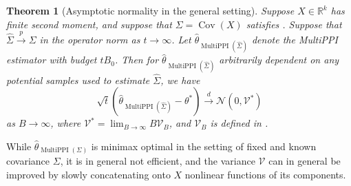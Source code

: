 \documentclass{article} %
\newcommand{\R}{\mathbb{R}}
\DeclareMathOperator{\Cov}{Cov}
\DeclareMathOperator{\multiPPI}{MultiPPI}
\newtheorem{theorem}{Theorem}
\newcommand{\wh}[1]{\widehat{#1}}
\begin{document}
\begin{theorem}[Asymptotic normality in the general setting]\label{thm:asymptotic2} Suppose $X\in\R^k$ has finite second moment, and suppose that $\Sigma=\Cov(X)$ satisfies . Suppose that $\wh{\Sigma}\overset{p}{\to}\Sigma$ in the operator norm as $t\to\infty$. Let $\hat{\theta}_{\multiPPI(\widehat{\Sigma})}$ denote the MultiPPI estimator with budget $tB_0$. Then for $\hat{\theta}_{\multiPPI(\widehat{\Sigma})}$ arbitrarily dependent on any potential samples used to estimate $\widehat{\Sigma}$, we have
    \[
    \sqrt{t}\left(\hat{\theta}_{\multiPPI(\widehat{\Sigma})}-\theta^*\right)\overset{d}{\to}\mathcal{N}(0,\mathcal{V}^*)
    \]
    as $B\to\infty$, where $\mathcal{V}^*=\lim_{B\to\infty} B\mathcal{V}_{B}$, and $\mathcal{V}_{B}$ is defined in .
\end{theorem}
While $\hat{\theta}_{\multiPPI(\Sigma)}$ is minimax optimal in the setting of fixed and known covariance $\Sigma$, it is in general not efficient, and the variance $\mathcal{V}$ can in general be improved by slowly concatenating onto $X$ nonlinear functions of its components. %
\end{document}
